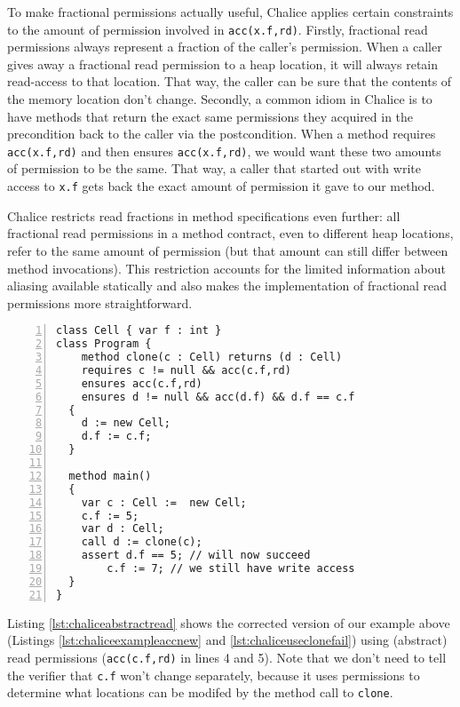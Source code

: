 To make fractional permissions actually useful, Chalice applies certain constraints to the amount of permission involved in \lstinline!acc(x.f,rd)!. 
Firstly, fractional read permissions always represent a fraction of the caller's permission. 
When a caller gives away a fractional read permission to a heap location, it will always retain read-access to that location. 
That way, the caller can be sure that the contents of the memory location don't change.
Secondly, a common idiom in Chalice is to have methods that return the exact same permissions they acquired in the precondition back to the caller via the postcondition.
When a method requires \lstinline!acc(x.f,rd)! and then ensures \lstinline!acc(x.f,rd)!, we would want these two amounts of permission to be the same. 
That way, a caller that started out with write access to \lstinline!x.f! gets back the exact amount of permission it gave to our method.

Chalice restricts read fractions in method specifications even further: all fractional read permissions in a method contract, even to different heap locations, refer to the same amount of permission (but that amount can still differ between method invocations).
This restriction accounts for the limited information about aliasing available statically and also makes the implementation of fractional read permissions more straightforward.

\begin{lstlisting}[language=Chalice,float,caption={Corrected example using abstract read permissions},label={lst:chaliceabstractread},numbers=left]
class Cell { var f : int }
class Program {
 	method clone(c : Cell) returns (d : Cell)
    requires c != null && acc(c.f,rd)
    ensures acc(c.f,rd)
    ensures d != null && acc(d.f) && d.f == c.f
  {
    d := new Cell;
    d.f := c.f;
  }

  method main()
  {
    var c : Cell :=  new Cell;
    c.f := 5;
    var d : Cell;
    call d := clone(c);
    assert d.f == 5; // will now succeed
		c.f := 7; // we still have write access
  }
}
\end{lstlisting}

Listing \ref{lst:chaliceabstractread} shows the corrected version of our example above (Listings \ref{lst:chaliceexampleaccnew} and \ref{lst:chaliceuseclonefail}) using (abstract) read permissions (\lstinline!acc(c.f,rd)! in lines 4 and 5). 
Note that we don't need to tell the verifier that \lstinline!c.f! won't change separately, because it uses permissions to determine what locations can be modifed by the method call to \lstinline!clone!.

